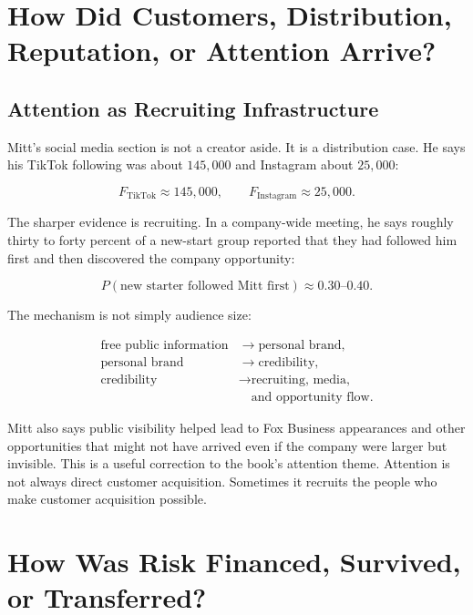 \documentclass[11pt,oneside]{book}
\begin{document}
\chapter{How Did Customers, Distribution, Reputation, or Attention Arrive?}

\section{Attention as Recruiting Infrastructure}

Mitt's social media section is not a creator aside. It is a distribution case. He says his TikTok following was about \(145{,}000\) and Instagram about \(25{,}000\):

\begin{equation}
F_{\mathrm{TikTok}}\approx 145{,}000,\qquad
F_{\mathrm{Instagram}}\approx 25{,}000.
\end{equation}

The sharper evidence is recruiting. In a company-wide meeting, he says roughly thirty to forty percent of a new-start group reported that they had followed him first and then discovered the company opportunity:

\begin{equation}
P(\text{new starter followed Mitt first})
\approx 0.30\text{--}0.40.
\end{equation}

The mechanism is not simply audience size:

\begin{align}
\text{free public information}&\to\text{personal brand},\\
\text{personal brand}&\to\text{credibility},\\
\text{credibility}&\to\text{recruiting, media,}\\
&\quad\text{and opportunity flow}.
\end{align}

Mitt also says public visibility helped lead to Fox Business appearances and other opportunities that might not have arrived even if the company were larger but invisible. This is a useful correction to the book's attention theme. Attention is not always direct customer acquisition. Sometimes it recruits the people who make customer acquisition possible.

\chapter{How Was Risk Financed, Survived, or Transferred?}
\end{document}
